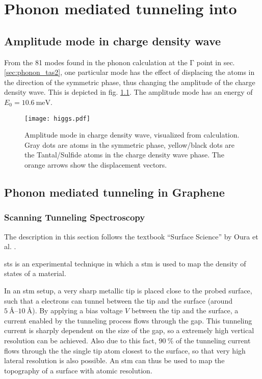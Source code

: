 \documentclass[main.tex]{subfiles}
\begin{document}
\chapter{Phonon mediated tunneling into \TaS}\label{ch:sts_gap_tas2}

\section{Amplitude mode in \TaS charge density wave}\label{sec:amplitude_mode_tas2}

From the 81 modes found in the phonon calculation at the \(\mathrm{\Gamma}\) point in sec. \ref{sec:phonon_tas2}, one particular mode has the effect of displacing the atoms in the direction of the symmetric phase, thus changing the amplitude of the charge density wave.
This is depicted in fig. \ref{fig:amplitude_mode_tas2}.
The amplitude mode has an energy of \(E_0 = \SI{10.6}{\milli\eV}\).

\begin{figure}[h!]
    \centering
    \texttt{[image: higgs.pdf]}
    \label{fig:amplitude_mode_tas2}
    \caption{Amplitude mode in \TaS charge density wave, visualized from \QE calculation. Gray dots are atoms in the symmetric phase, yellow/black dots are the Tantal/Sulfide atoms in the charge density wave phase. The orange arrows show the displacement vectors.}
\end{figure}

\section{Phonon mediated tunneling in Graphene}

\subsection{Scanning Tunneling Spectroscopy}\label{sub:sts}

The description in this section follows the textbook \enquote{Surface Science} by Oura et al. \cite{oura_surface_2003}.

\acrfull{sts} is an experimental technique in which a \acrfull{stm} is used to map the density of states of a material.

In an \acrshort{stm} setup, a very sharp metallic tip is placed close to the probed surface, such that a electrons can tunnel between the tip and the surface (around \(\SIrange{5}{10}{\angstrom}\)).
By applying a bias voltage \(V\) between the tip and the surface, a current enabled by the tunneling process flows through the gap.
This tunneling current is sharply dependent on the size of the gap, so a extremely high vertical resolution can be achieved.
Also due to this fact, \(\SI{90}{\percent}\) of the tunneling current flows through the the single tip atom closest to the surface, so that very high lateral resolution is also possible.
An \acrshort{stm} can thus be used to map the topography of a surface with atomic resolution.
\end{document}

